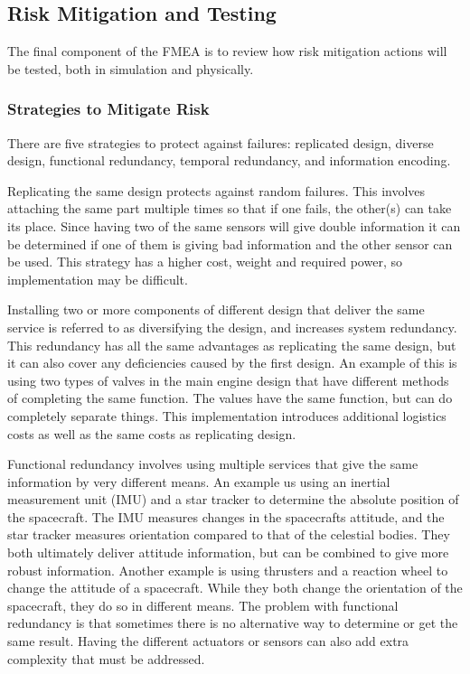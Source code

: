 \documentclass[paper=letter, fontsize=11pt]{scrartcl} %
\numberwithin{equation}{section} %
\numberwithin{figure}{section} %
\numberwithin{table}{section} %
\begin{document}
\subsection{Risk Mitigation and Testing}
The final component of the FMEA is to review how risk mitigation actions will be tested, both in simulation and physically.

\subsubsection{Strategies to Mitigate Risk}
There are five strategies to protect against failures: replicated design, diverse design, functional redundancy, temporal redundancy, and information encoding.

Replicating the same design protects against random failures. This involves attaching the same part multiple times so that if one fails, the other(s) can take its place. Since having two of the same sensors will give double information it can be determined if one of them is giving bad information and the other sensor can be used. This strategy has a higher cost, weight and required power, so implementation may be difficult.

Installing two or more components of different design that deliver the same service is referred to as diversifying the design, and increases system redundancy. This redundancy has all the same advantages as replicating the same design, but it can also cover any deficiencies caused by the first design. An example of this is using two types of valves in the main engine design that have different methods of completing the same function. The values have the same function, but can do completely separate things. This implementation introduces additional logistics costs as well as the same costs as replicating design.

Functional redundancy involves using multiple services that give the same information by very different means. An example us using an inertial measurement unit (IMU) and a star tracker to determine the absolute position of the spacecraft. The IMU measures changes in the spacecrafts attitude, and the star tracker measures orientation compared to that of the celestial bodies. They both ultimately deliver attitude information, but can be combined to give more robust information. Another example is using thrusters and a reaction wheel to change the attitude of a spacecraft. While they both change the orientation of the spacecraft, they do so in different means. The problem with functional redundancy is that sometimes there is no alternative way to determine or get the same result. Having the different actuators or sensors can also add extra complexity that must be addressed.
\end{document}

